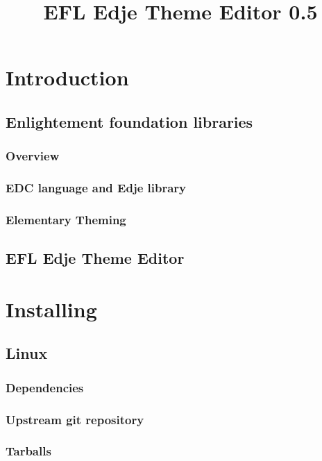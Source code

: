 \documentclass[titlepage,oneside,11pt]{book}
\title{EFL Edje Theme Editor 0.5}
\begin{document}
\maketitle
\tableofcontents
\chapter{Introduction}
\section{Enlightement foundation libraries}
\subsection{Overview}
\subsection{EDC language and Edje library}
\subsection{Elementary Theming}
\newpage
\section{EFL Edje Theme Editor}
\chapter{Installing}
\section{Linux}
\subsection{Dependencies}
\subsection{Upstream git repository}
\subsection{Tarballs}
\end{document}
